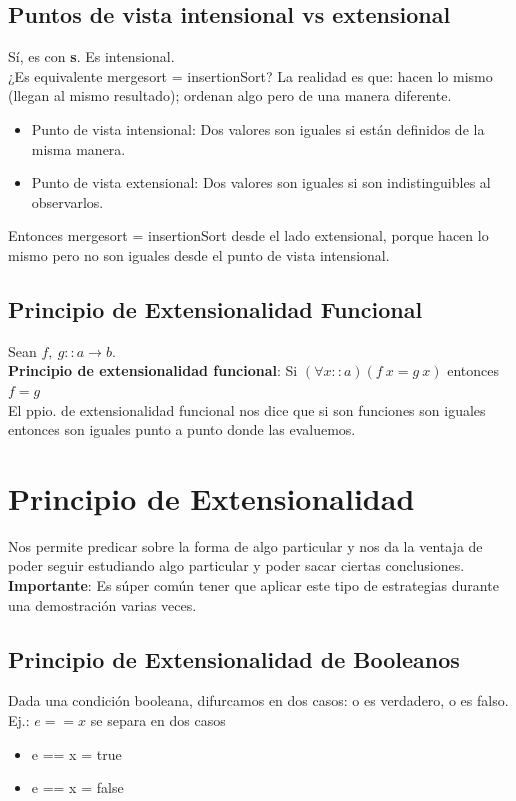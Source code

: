 \documentclass[10pt,a4paper]{article}
\begin{document}
\subsection*{Puntos de vista intensional vs extensional}
Sí, es con \textbf{s}. Es intensional. \\
¿Es equivalente mergesort = insertionSort? La realidad es que: hacen lo mismo (llegan al mismo resultado); ordenan algo pero de una manera diferente.
\begin{itemize}
    \item Punto de vista intensional: Dos valores son iguales si están definidos de la misma manera.
    \item Punto de vista extensional: Dos valores son iguales si son indistinguibles al observarlos.
\end{itemize}
Entonces mergesort = insertionSort desde el lado extensional, porque hacen lo mismo pero no son iguales desde el punto de vista intensional. 
\subsection*{Principio de Extensionalidad Funcional}
Sean $f, \ g :: a \rightarrow b$. \\
\textbf{Principio de extensionalidad funcional}: Si $(\forall x :: a)(f \ x  =  g \ x) $ entonces $f=g$ \\
El ppio. de extensionalidad funcional nos dice que si son funciones son iguales entonces son iguales punto a punto donde las evaluemos.
\section*{Principio de Extensionalidad}
Nos permite predicar sobre la forma de algo particular y nos da la ventaja de poder seguir estudiando algo particular y poder sacar ciertas conclusiones. \\
\textbf{Importante}: Es súper común tener que aplicar este tipo de estrategias durante una demostración varias veces.   
\subsection*{Principio de Extensionalidad de Booleanos}
Dada una condición booleana, difurcamos en dos casos: o es verdadero, o es falso. \\
Ej.: $e == x$ se separa en dos casos 
\begin{itemize}
    \item e == x = true 
    \item e == x = false
\end{itemize}
\end{document}
